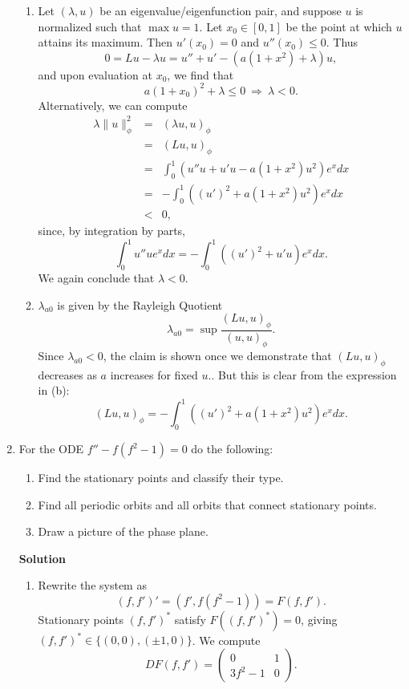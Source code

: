 \documentclass{article}
\begin{document}
\begin{enumerate}
\begin{enumerate}
\item Let \((\lambda,u)\) be an eigenvalue/eigenfunction pair, and suppose \(u\) is normalized such that \(\max u = 1\).  Let \(x_0 \in [0,1]\) be the point at which \(u\) attains its maximum.  Then \(u'(x_0) = 0\) and \(u''(x_0) \leq 0\).  Thus
\[0 = L u - \lambda u
    = u'' + u' - \left( a (1 + x^2) + \lambda \right) u,\]
and upon evaluation at \(x_0\), we find that
\[a (1 + x_0)^2 + \lambda \leq 0 \ \Rightarrow \ \lambda < 0.\]
Alternatively, we can compute
\begin{eqnarray*}
\lambda \|u\|_{\phi}^2
& = & (\lambda u, u)_{\phi} \\
& = & (L u, u)_{\phi} \\
& = & \int_0^1 \left( u'' u + u' u - a (1 + x^2) u^2 \right) e^x dx \\
& = & -\int_0^1 \left( (u')^2 + a (1 + x^2) u^2 \right) e^x dx \\
& < & 0,
\end{eqnarray*}
since, by integration by parts,
\[\int_0^1 u'' u e^x dx = -\int_0^1 \left( (u')^2 + u' u \right) e^x dx.\]
We again conclude that \(\lambda < 0\).

\item \(\lambda_{a0}\) is given by the Rayleigh Quotient
\[\lambda_{a0} = \sup \frac{(L u, u)_{\phi}}{(u, u)_{\phi}}.\]
Since \(\lambda_{a0} < 0\), the claim is shown once we demonstrate that \((L u, u)_{\phi}\) decreases as \(a\) increases for fixed \(u\)..  But this is clear from the expression in (b):
\[(L u, u)_{\phi} = -\int_0^1 \left( (u')^2 + a (1 + x^2) u^2 \right) e^x dx.\]

\end{enumerate}



\item For the ODE \(f'' - f (f^2 - 1) = 0\) do the following:

\begin{enumerate}
\item Find the stationary points and classify their type.

\item Find all periodic orbits and all orbits that connect stationary points.

\item Draw a picture of the phase plane.

\end{enumerate}

{\bf Solution}

\begin{enumerate}
\item Rewrite the system as
\[(f,f')' = (f', f(f^2 - 1)) = F(f,f').\]
Stationary points \((f,f')^*\) satisfy \(F((f,f')^*) = 0\), giving \((f,f')^* \in \{(0,0), (\pm 1,0)\}\).  We compute
\[DF(f,f') = \left( \begin{array}{cc} 0 & 1 \\ 3 f^2 - 1 & 0 \end{array} \right).\]


\end{enumerate}
\end{enumerate}
\end{document}
